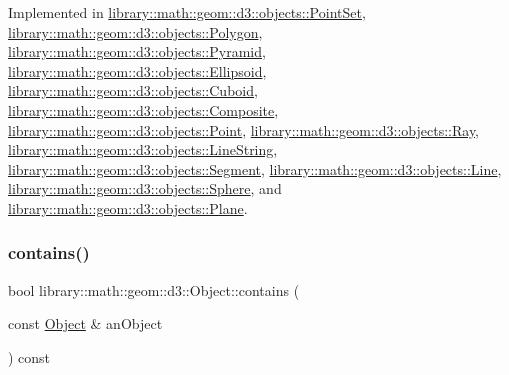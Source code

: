 Implemented in \hyperlink{classlibrary_1_1math_1_1geom_1_1d3_1_1objects_1_1_point_set_ab7c4ec1d48795973be648f0907b84484}{library\+::math\+::geom\+::d3\+::objects\+::\+Point\+Set}, \hyperlink{classlibrary_1_1math_1_1geom_1_1d3_1_1objects_1_1_polygon_a54440dcce091424ecabdacc30892c2fc}{library\+::math\+::geom\+::d3\+::objects\+::\+Polygon}, \hyperlink{classlibrary_1_1math_1_1geom_1_1d3_1_1objects_1_1_pyramid_a734bc02bbfec62647743649bf5d2b706}{library\+::math\+::geom\+::d3\+::objects\+::\+Pyramid}, \hyperlink{classlibrary_1_1math_1_1geom_1_1d3_1_1objects_1_1_ellipsoid_a8982455e000708f1b7e4caf728e7ad40}{library\+::math\+::geom\+::d3\+::objects\+::\+Ellipsoid}, \hyperlink{classlibrary_1_1math_1_1geom_1_1d3_1_1objects_1_1_cuboid_ae60199a546a4d4de479f891c3b1db05a}{library\+::math\+::geom\+::d3\+::objects\+::\+Cuboid}, \hyperlink{classlibrary_1_1math_1_1geom_1_1d3_1_1objects_1_1_composite_a8d1d598683fe3149498b55a089217686}{library\+::math\+::geom\+::d3\+::objects\+::\+Composite}, \hyperlink{classlibrary_1_1math_1_1geom_1_1d3_1_1objects_1_1_point_a32aa1e233c6ac5341605961f6bf0f210}{library\+::math\+::geom\+::d3\+::objects\+::\+Point}, \hyperlink{classlibrary_1_1math_1_1geom_1_1d3_1_1objects_1_1_ray_a247ea36c39c3b44d003b157689850ae4}{library\+::math\+::geom\+::d3\+::objects\+::\+Ray}, \hyperlink{classlibrary_1_1math_1_1geom_1_1d3_1_1objects_1_1_line_string_a95ef100ab7053589b845980ca4c845b3}{library\+::math\+::geom\+::d3\+::objects\+::\+Line\+String}, \hyperlink{classlibrary_1_1math_1_1geom_1_1d3_1_1objects_1_1_segment_a589ad56339616f362cee84a2ecab61a4}{library\+::math\+::geom\+::d3\+::objects\+::\+Segment}, \hyperlink{classlibrary_1_1math_1_1geom_1_1d3_1_1objects_1_1_line_a55382b24007bccdae721176d0f73536f}{library\+::math\+::geom\+::d3\+::objects\+::\+Line}, \hyperlink{classlibrary_1_1math_1_1geom_1_1d3_1_1objects_1_1_sphere_a58370a8ff15b7c5a48cf4ffec5be3015}{library\+::math\+::geom\+::d3\+::objects\+::\+Sphere}, and \hyperlink{classlibrary_1_1math_1_1geom_1_1d3_1_1objects_1_1_plane_a0b6a4ae7bef06f3995f8fd9d32a88870}{library\+::math\+::geom\+::d3\+::objects\+::\+Plane}.

\mbox{\label{classlibrary_1_1math_1_1geom_1_1d3_1_1_object_abaf45bf02ca165ba7bf685b24f5f97ef}} 
\subsubsection{\texorpdfstring{contains()}{contains()}}
{\footnotesize\ttfamily bool library\+::math\+::geom\+::d3\+::\+Object\+::contains (\begin{DoxyParamCaption}\item[{const \hyperlink{classlibrary_1_1math_1_1geom_1_1d3_1_1_object}{Object} \&}]{an\+Object }\end{DoxyParamCaption}) const\hspace{0.3cm}{\ttfamily [virtual]}}



